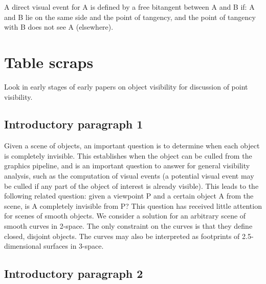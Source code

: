 \documentclass[12pt]{article}
\begin{document}
A direct visual event for A is defined by a free bitangent between A and B if:
A and B lie on the same side and the point of tangency, and
the point of tangency with B does not see A (elsewhere).

\clearpage


\section{Table scraps}

Look in early stages of early papers on object visibility for discussion of 
point visibility.

\subsection{Introductory paragraph 1}

Given a scene of objects, an important question
is to determine when each object is completely invisible.
This establishes when the object can be culled from the graphics pipeline,
and is an important question to answer for general visibility analysis,
such as the computation of visual events (a potential visual event may be culled
if any part of the object of interest is already visible).
This leads to the following related question: given a viewpoint P and a certain
object A from the scene, is A completely invisible from P?
This question has received little attention for scenes of smooth objects.
We consider a solution for an arbitrary scene of smooth curves in 2-space.
The only constraint on the curves is that they define closed, disjoint objects.
The curves may also be interpreted as footprints of 2.5-dimensional surfaces
in 3-space.


\subsection{Introductory paragraph 2}
\end{document}
